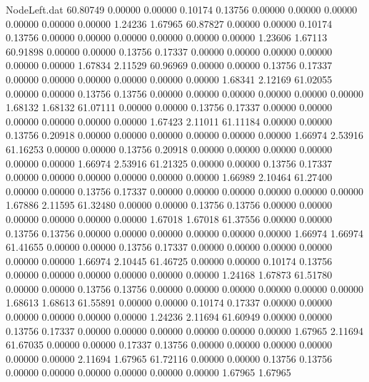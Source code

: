 \begin{filecontents}{NodeLeft.dat}
  60.80749    0.00000    0.00000     0.10174    0.13756    0.00000    0.00000    0.00000    0.00000    0.00000    0.00000    1.24236    1.67965
  60.87827    0.00000    0.00000     0.10174    0.13756    0.00000    0.00000    0.00000    0.00000    0.00000    0.00000    1.23606    1.67113
  60.91898    0.00000    0.00000     0.13756    0.17337    0.00000    0.00000    0.00000    0.00000    0.00000    0.00000    1.67834    2.11529
  60.96969    0.00000    0.00000     0.13756    0.17337    0.00000    0.00000    0.00000    0.00000    0.00000    0.00000    1.68341    2.12169
  61.02055    0.00000    0.00000     0.13756    0.13756    0.00000    0.00000    0.00000    0.00000    0.00000    0.00000    1.68132    1.68132
  61.07111    0.00000    0.00000     0.13756    0.17337    0.00000    0.00000    0.00000    0.00000    0.00000    0.00000    1.67423    2.11011
  61.11184    0.00000    0.00000     0.13756    0.20918    0.00000    0.00000    0.00000    0.00000    0.00000    0.00000    1.66974    2.53916
  61.16253    0.00000    0.00000     0.13756    0.20918    0.00000    0.00000    0.00000    0.00000    0.00000    0.00000    1.66974    2.53916
  61.21325    0.00000    0.00000     0.13756    0.17337    0.00000    0.00000    0.00000    0.00000    0.00000    0.00000    1.66989    2.10464
  61.27400    0.00000    0.00000     0.13756    0.17337    0.00000    0.00000    0.00000    0.00000    0.00000    0.00000    1.67886    2.11595
  61.32480    0.00000    0.00000     0.13756    0.13756    0.00000    0.00000    0.00000    0.00000    0.00000    0.00000    1.67018    1.67018
  61.37556    0.00000    0.00000     0.13756    0.13756    0.00000    0.00000    0.00000    0.00000    0.00000    0.00000    1.66974    1.66974
  61.41655    0.00000    0.00000     0.13756    0.17337    0.00000    0.00000    0.00000    0.00000    0.00000    0.00000    1.66974    2.10445
  61.46725    0.00000    0.00000     0.10174    0.13756    0.00000    0.00000    0.00000    0.00000    0.00000    0.00000    1.24168    1.67873
  61.51780    0.00000    0.00000     0.13756    0.13756    0.00000    0.00000    0.00000    0.00000    0.00000    0.00000    1.68613    1.68613
  61.55891    0.00000    0.00000     0.10174    0.17337    0.00000    0.00000    0.00000    0.00000    0.00000    0.00000    1.24236    2.11694
  61.60949    0.00000    0.00000     0.13756    0.17337    0.00000    0.00000    0.00000    0.00000    0.00000    0.00000    1.67965    2.11694
  61.67035    0.00000    0.00000     0.17337    0.13756    0.00000    0.00000    0.00000    0.00000    0.00000    0.00000    2.11694    1.67965
  61.72116    0.00000    0.00000     0.13756    0.13756    0.00000    0.00000    0.00000    0.00000    0.00000    0.00000    1.67965    1.67965

\end{filecontents}
